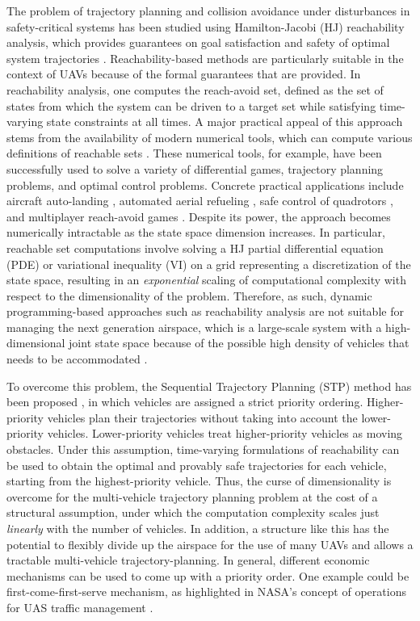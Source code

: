 The problem of trajectory planning and collision avoidance under disturbances in safety-critical systems has been studied using Hamilton-Jacobi (HJ) reachability analysis, which provides guarantees on goal satisfaction and safety of optimal system trajectories \cite{Barron90, Mitchell05, Bokanowski10, Bokanowski11, Margellos11, Fisac15}. Reachability-based methods are particularly suitable in the context of UAVs because of the formal guarantees that are provided. In reachability analysis, one computes the reach-avoid set, defined as the set of states from which the system can be driven to a target set while satisfying time-varying state constraints at all times. A major practical appeal of this approach stems from the availability of modern numerical tools, which can compute various definitions of reachable sets \cite{Sethian96, Osher02, Mitchell02, Mitchell07b}. These numerical tools, for example, have been successfully used to solve a variety of differential games, trajectory planning problems, and optimal control problems. Concrete practical applications include aircraft auto-landing \cite{Bayen07}, automated aerial refueling \cite{Ding08}, safe control of quadrotors \cite{Bouffard12}, and multiplayer reach-avoid games \cite{Huang11}. Despite its power, the approach becomes numerically intractable as the state space dimension increases. In particular, reachable set computations involve solving a HJ partial differential equation (PDE) or variational inequality (VI) on a grid representing a discretization of the state space, resulting in an \textit{exponential} scaling of computational complexity with respect to the dimensionality of the problem. Therefore, as such, dynamic programming-based approaches such as reachability analysis are not suitable for managing the next generation airspace, which is a large-scale system with a high-dimensional joint state space because of the possible high density of vehicles that needs to be accommodated \cite{Kopardekar16}.  

To overcome this problem, the Sequential Trajectory Planning (STP) method has been proposed \cite{Chen15c}, in which vehicles are assigned a strict priority ordering. Higher-priority vehicles plan their trajectories without taking into account the lower-priority vehicles. Lower-priority vehicles treat higher-priority vehicles as moving obstacles. Under this assumption, time-varying formulations of reachability \cite{Bokanowski11, Fisac15} can be used to obtain the optimal and provably safe trajectories for each vehicle, starting from the highest-priority vehicle. Thus, the curse of dimensionality is overcome for the multi-vehicle trajectory planning problem at the cost of a structural assumption, under which the computation complexity scales just \textit{linearly} with the number of vehicles. In addition, a structure like this has the potential to flexibly divide up the airspace for the use of many UAVs and allows a tractable multi-vehicle trajectory-planning. In general, different economic mechanisms can be used to come up with a priority order. One example could be first-come-first-serve mechanism, as highlighted in NASA’s concept of operations for UAS traffic management \cite{Kopardekar16}. 

